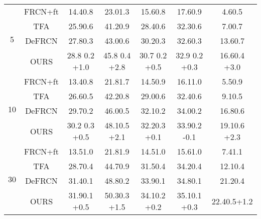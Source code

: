 \documentclass{article}
\begin{document}
\begin{table}[hbt!]
\begin{tabular}{c|c|ccc|c|c}
         \hline
         \multirow{4}{*}{5} & FRCN+ft \cite{metarcnn} & 14.40.8& 23.01.3 &15.60.8 & 17.60.9 & 4.60.5 \\
         & TFA \cite{tfa} & 25.90.6 & 41.20.9 & 28.40.6 & 32.30.6 & 7.00.7 \\
         & DeFRCN \cite{defrcn}& 27.80.3 & 43.00.6 & 30.20.3 & 32.60.3 & 13.60.7 \\
         & \cellcolor{gray!30} OURS & \cellcolor{gray!30} 28.8 0.2 {\scriptsize \color{red}+1.0}& \cellcolor{gray!30} 45.8 0.4 {\scriptsize \color{red}+2.8}& \cellcolor{gray!30} 30.7 0.2 {\scriptsize \color{red}+0.5}& \cellcolor{gray!30} 32.9 0.2 {\scriptsize \color{red}+0.3}& \cellcolor{gray!30} 16.60.4 {\scriptsize \color{red}+3.0}\\
         \hline
         \multirow{4}{*}{10} & FRCN+ft \cite{metarcnn} & 13.40.8& 21.81.7 &14.50.9 & 16.11.0 & 5.50.9 \\
         & TFA \cite{tfa} & 26.60.5 & 42.20.8 & 29.00.6 & 32.40.6 & 9.10.5 \\
         & DeFRCN \cite{defrcn}& 29.70.2 & 46.00.5 & 32.10.2 & 34.00.2 & 16.80.6 \\
         & \cellcolor{gray!30} OURS & \cellcolor{gray!30} 30.2 0.3 {\scriptsize \color{red}+0.5}& \cellcolor{gray!30} 48.10.5 {\scriptsize \color{red}+2.1}& \cellcolor{gray!30} 32.20.3 {\scriptsize \color{red}+0.1}& \cellcolor{gray!30} 33.90.2 {\scriptsize \color{blue}-0.1}& \cellcolor{gray!30} 19.10.6 {\scriptsize \color{red}+2.3}\\
         \hline
         \multirow{4}{*}{30} & FRCN+ft \cite{metarcnn} & 13.51.0& 21.81.9 &14.51.0 & 15.61.0 & 7.41.1 \\
         & TFA \cite{tfa} & 28.70.4 & 44.70.9 & 31.50.4 & 34.20.4 & 12.10.4 \\
         & DeFRCN \cite{defrcn}& 31.40.1 & 48.80.2 & 33.90.1 & 34.80.1 & 21.20.4 \\
         & \cellcolor{gray!30} OURS & \cellcolor{gray!30} 31.90.1 {\scriptsize \color{red}+0.5}& \cellcolor{gray!30} 50.30.3 {\scriptsize \color{red}+1.5}& \cellcolor{gray!30} 34.10.2 {\scriptsize \color{red}+0.2}& \cellcolor{gray!30} 35.10.1 {\scriptsize \color{red}+0.3}& \cellcolor{gray!30} 22.40.5{\scriptsize \color{red}+1.2} \\

         \bottomrule
    \end{tabular}
    
    \label{tab:gfsod_coco}
\end{table}
\newpage
\end{document}
